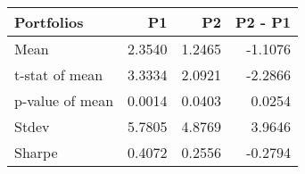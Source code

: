 \begin{tabular}{lrrr}
\toprule
Portfolios & P1 & P2 & P2 - P1 \\
\midrule
Mean & 2.3540 & 1.2465 & -1.1076 \\
t-stat of mean & 3.3334 & 2.0921 & -2.2866 \\
p-value of mean & 0.0014 & 0.0403 & 0.0254 \\
Stdev & 5.7805 & 4.8769 & 3.9646 \\
Sharpe & 0.4072 & 0.2556 & -0.2794 \\
\bottomrule
\end{tabular}
